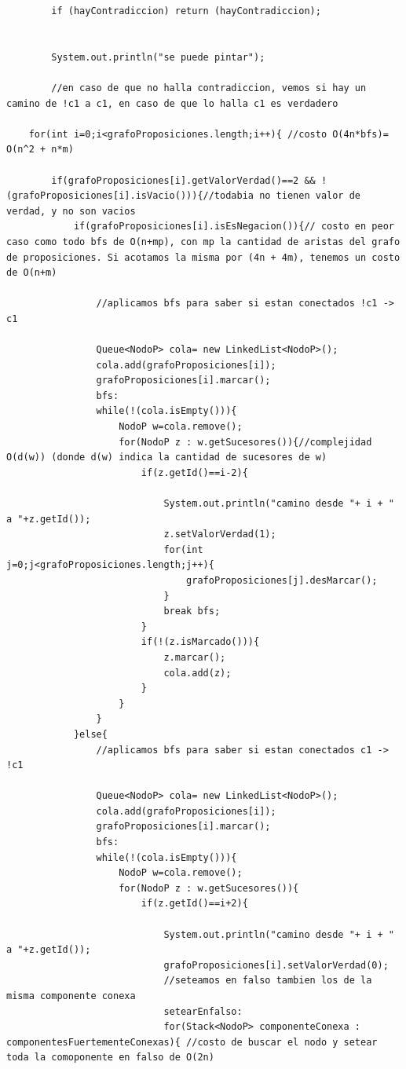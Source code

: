 \documentclass[a4paper]{article}
\begin{document}
\begin{lstlisting}
		if (hayContradiccion) return (hayContradiccion);

		
		System.out.println("se puede pintar");
		
		//en caso de que no halla contradiccion, vemos si hay un camino de !c1 a c1, en caso de que lo halla c1 es verdadero
	
	for(int i=0;i<grafoProposiciones.length;i++){ //costo O(4n*bfs)= O(n^2 + n*m)
		
		if(grafoProposiciones[i].getValorVerdad()==2 && !(grafoProposiciones[i].isVacio())){//todabia no tienen valor de verdad, y no son vacios
			if(grafoProposiciones[i].isEsNegacion()){// costo en peor caso como todo bfs de O(n+mp), con mp la cantidad de aristas del grafo de proposiciones. Si acotamos la misma por (4n + 4m), tenemos un costo de O(n+m)
				
				//aplicamos bfs para saber si estan conectados !c1 -> c1
				
				Queue<NodoP> cola= new LinkedList<NodoP>();
				cola.add(grafoProposiciones[i]);
				grafoProposiciones[i].marcar();
				bfs:
				while(!(cola.isEmpty())){
					NodoP w=cola.remove();
					for(NodoP z : w.getSucesores()){//complejidad O(d(w)) (donde d(w) indica la cantidad de sucesores de w)
						if(z.getId()==i-2){
							
							System.out.println("camino desde "+ i + " a "+z.getId());
							z.setValorVerdad(1);
							for(int j=0;j<grafoProposiciones.length;j++){
								grafoProposiciones[j].desMarcar();
							}
							break bfs;
						}	
						if(!(z.isMarcado())){
							z.marcar();
							cola.add(z);
						}
					}
				}
			}else{
				//aplicamos bfs para saber si estan conectados c1 -> !c1
				
				Queue<NodoP> cola= new LinkedList<NodoP>();
				cola.add(grafoProposiciones[i]);
				grafoProposiciones[i].marcar();
				bfs:
				while(!(cola.isEmpty())){
					NodoP w=cola.remove();
					for(NodoP z : w.getSucesores()){
						if(z.getId()==i+2){
							
							System.out.println("camino desde "+ i + " a "+z.getId());
							grafoProposiciones[i].setValorVerdad(0);
							//seteamos en falso tambien los de la misma componente conexa 
							setearEnfalso:
							for(Stack<NodoP> componenteConexa : componentesFuertementeConexas){ //costo de buscar el nodo y setear toda la comoponente en falso de O(2n)
													

\end{lstlisting}
\end{document}
